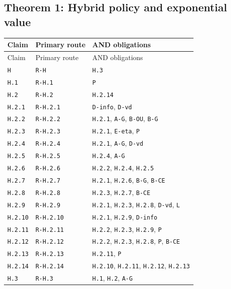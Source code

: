 \documentclass[11pt,letterpaper]{article}
\begin{document}
{\subsection{Theorem 1: Hybrid policy and exponential value}
\begin{longtable}{>{\raggedright\arraybackslash}p{.14\linewidth}>{\raggedright\arraybackslash}p{.21\linewidth}>{\raggedright\arraybackslash}p{.54\linewidth}}
\toprule
Claim & Primary route & AND obligations \\
\midrule\endfirsthead
\toprule
Claim & Primary route & AND obligations \\
\midrule\endhead
\bottomrule\endfoot
\texttt{H} & \texttt{R-H} & \texttt{H.3} \\[3pt]
\texttt{H.1} & \texttt{R-H.1} & \texttt{P} \\[3pt]
\texttt{H.2} & \texttt{R-H.2} & \texttt{H.2.14} \\[3pt]
\texttt{H.2.1} & \texttt{R-H.2.1} & \texttt{D-info}, \texttt{D-vd} \\[3pt]
\texttt{H.2.2} & \texttt{R-H.2.2} & \texttt{H.2.1}, \texttt{A-G}, \texttt{B-OU}, \texttt{B-G} \\[3pt]
\texttt{H.2.3} & \texttt{R-H.2.3} & \texttt{H.2.1}, \texttt{E-eta}, \texttt{P} \\[3pt]
\texttt{H.2.4} & \texttt{R-H.2.4} & \texttt{H.2.1}, \texttt{A-G}, \texttt{D-vd} \\[3pt]
\texttt{H.2.5} & \texttt{R-H.2.5} & \texttt{H.2.4}, \texttt{A-G} \\[3pt]
\texttt{H.2.6} & \texttt{R-H.2.6} & \texttt{H.2.2}, \texttt{H.2.4}, \texttt{H.2.5} \\[3pt]
\texttt{H.2.7} & \texttt{R-H.2.7} & \texttt{H.2.1}, \texttt{H.2.6}, \texttt{B-G}, \texttt{B-CE} \\[3pt]
\texttt{H.2.8} & \texttt{R-H.2.8} & \texttt{H.2.3}, \texttt{H.2.7}, \texttt{B-CE} \\[3pt]
\texttt{H.2.9} & \texttt{R-H.2.9} & \texttt{H.2.1}, \texttt{H.2.3}, \texttt{H.2.8}, \texttt{D-vd}, \texttt{L} \\[3pt]
\texttt{H.2.10} & \texttt{R-H.2.10} & \texttt{H.2.1}, \texttt{H.2.9}, \texttt{D-info} \\[3pt]
\texttt{H.2.11} & \texttt{R-H.2.11} & \texttt{H.2.2}, \texttt{H.2.3}, \texttt{H.2.9}, \texttt{P} \\[3pt]
\texttt{H.2.12} & \texttt{R-H.2.12} & \texttt{H.2.2}, \texttt{H.2.3}, \texttt{H.2.8}, \texttt{P}, \texttt{B-CE} \\[3pt]
\texttt{H.2.13} & \texttt{R-H.2.13} & \texttt{H.2.11}, \texttt{P} \\[3pt]
\texttt{H.2.14} & \texttt{R-H.2.14} & \texttt{H.2.10}, \texttt{H.2.11}, \texttt{H.2.12}, \texttt{H.2.13} \\*[3pt]
\texttt{H.3} & \texttt{R-H.3} & \texttt{H.1}, \texttt{H.2}, \texttt{A-G} \\[3pt]
\end{longtable}
}
\end{document}
